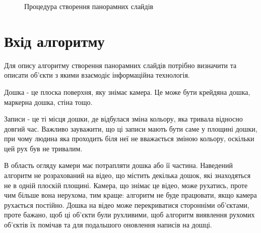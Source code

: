\usetikzlibrary{arrows,positioning,shapes}
\begin{figure}
    \begin{center}
    \end{center}
    \caption{Процедура створення панорамних слайдів
        \label{fig:pipeline}
    }
\end{figure}

\section{Вхід алгоритму}

Для опису алгоритму створення панорамних слайдів потрібно визначити та
описати об'єкти з якими взаємодіє інформаційна технологія.

Дошка - це плоска поверхня, яку знімає камера. Це може бути крейдяна
дошка, маркерна дошка, стіна тощо.

Записи - це ті місця дошки, де відбулася зміна кольору, яка тривала
відносно довгий час. Важливо зауважити, що ці записи мають бути
саме у площині дошки, при чому людина яка проходить біля неї не вважається
зміною кольору, оскільки цей рух був не тривалим.

В область огляду камери має потрапляти дошка або її частина. Наведений
алгоритм не розрахований на відео, що містить декілька дошок, які знаходяться
не в одній плоскій площині. Камера, що знімає це відео, може рухатись, проте
чим більше вона нерухома, тим краще: алгоритм не буде працювати, якщо камера
рухається постійно. Дошка на відео може перекриватися сторонніми об'єктами,
проте бажано, щоб ці об'єкти були рухливими, щоб алгоритм виявлення рухомих
об'єктів їх помічав та для подальшого оновлення написів на дошці.


